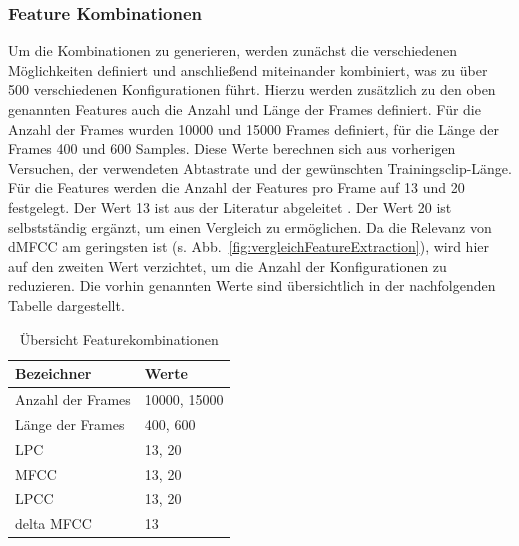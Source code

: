 \subsubsection{Feature Kombinationen}\label{sec:FeatureKombination}

Um die Kombinationen zu generieren, werden zunächst die verschiedenen Möglichkeiten definiert und anschließend miteinander kombiniert, was zu über 500 verschiedenen Konfigurationen führt.
Hierzu werden zusätzlich zu den oben genannten Features auch die Anzahl und Länge der Frames definiert.
Für die Anzahl der Frames wurden 10000 und 15000 Frames definiert, für die Länge der Frames 400 und 600 Samples.
Diese Werte berechnen sich aus vorherigen Versuchen, der verwendeten Abtastrate und der gewünschten Trainingsclip-Länge.
Für die Features werden die Anzahl der Features pro Frame auf 13 und 20 festgelegt.
Der Wert 13 ist aus der Literatur abgeleitet \autocite[vgl.][S. 69]{valerio_velardo_mel-frequency_2020}.
Der Wert 20 ist selbstständig ergänzt, um einen Vergleich zu ermöglichen.
Da die Relevanz von \ac{dMFCC} am geringsten ist (s. Abb.~\ref{fig:vergleichFeatureExtraction}), wird hier auf den zweiten Wert verzichtet, um die Anzahl der Konfigurationen zu reduzieren.
Die vorhin genannten Werte sind übersichtlich in der nachfolgenden Tabelle dargestellt.
\begin{table}[H]
    \centering
    \begin{tabular}{l|l}
        \textbf{Bezeichner} & \textbf{Werte}   \\ \hline
        Anzahl der Frames   & 10000, 15000 \\ \hline
        Länge der Frames    & 400, 600     \\ \hline
        LPC                 & 13, 20       \\ \hline
        MFCC                & 13, 20       \\ \hline
        LPCC                & 13, 20       \\ \hline
        delta MFCC          & 13          
    \end{tabular}
    \caption{Übersicht Featurekombinationen}
\end{table}


